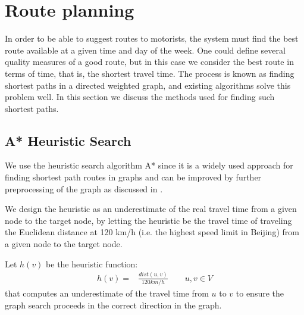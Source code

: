 \section{Route planning}
In order to be able to suggest routes to motorists, the system must find the best route available at a given time and day of the week. One could define several quality measures of a good route, but in this case we consider the best route in terms of time, that is, the shortest travel time. The process is known as finding shortest paths in a directed weighted graph, and existing algorithms solve this problem well. In this section we discuss the methods used for finding such shortest paths.

\subsection{A* Heuristic Search}\label{sec:pathfinding}
We use the heuristic search algorithm A* since it is a widely used approach for finding shortest path routes in graphs and can be improved by further preprocessing of the graph as discussed in .

We design the heuristic as an underestimate of the real travel time from a given node to the target node, by letting the heuristic be the travel time of traveling the Euclidean distance at 120 km/h (i.e. the highest speed limit in Beijing) from a given node to the target node.

Let $h(v)$ be the heuristic function:
\begin{align*}
h(v) = &\frac{dist(u,v)}{120 km/h} \qquad u,v \in V
\end{align*}
that computes an underestimate of the travel time from $u$ to $v$ to ensure the graph search proceeds in the correct direction in the graph.

